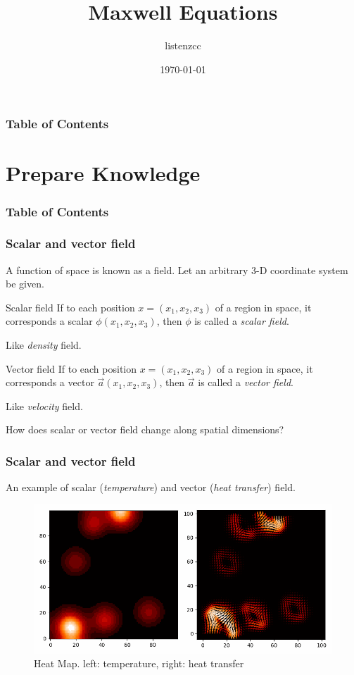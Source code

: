 \documentclass{beamer}
\title{Maxwell Equations}
\author{listenzcc}
\institute[VFU] %
{
  \inst{1}%
  Faculty of Physics\\
  Very Famous University
  \and
  \inst{2}%
  Faculty of Chemistry\\
  Very Famous University
}
\date{\today}
\begin{document}
\frame{\titlepage}

\begin{frame}
    \frametitle{Table of Contents}
    \tableofcontents
\end{frame}


\section{Prepare Knowledge}
\begin{frame}
    \frametitle{Table of Contents}
    \tableofcontents[currentsection]
\end{frame}

\begin{frame}
    \frametitle{Scalar and vector field}
    A function of space is known as a field.
    Let an arbitrary 3-D coordinate system be given.

    \begin{block}{Scalar field}
        If to each position $x = (x_{1}, x_{2}, x_{3})$ of a region in space, it corresponds a scalar $\phi (x_{1}, x_{2}, x_{3})$, then $\phi$ is called a \emph{scalar field}.

        Like \emph{density} field.
    \end{block}

    \begin{block}{Vector field}
        If to each position $x = (x_{1}, x_{2}, x_{3})$ of a region in space, it corresponds a vector $\vec{a} (x_{1}, x_{2}, x_{3})$, then $\vec{a}$ is called a \emph{vector field}.

        Like \emph{velocity} field.
    \end{block}

    How does scalar or vector field change along spatial dimensions?
\end{frame}

\begin{frame}
    \frametitle{Scalar and vector field}
    An example of scalar (\emph{temperature}) and vector (\emph{heat transfer}) field.
    \begin{figure}[H]
        \centering
        \includegraphics[height=0.5\textheight]{heatmap.png}
        \caption{Heat Map. left: temperature, right: heat transfer}
        \label{fig: Heat map}
    \end{figure}
\end{frame}
\end{document}
